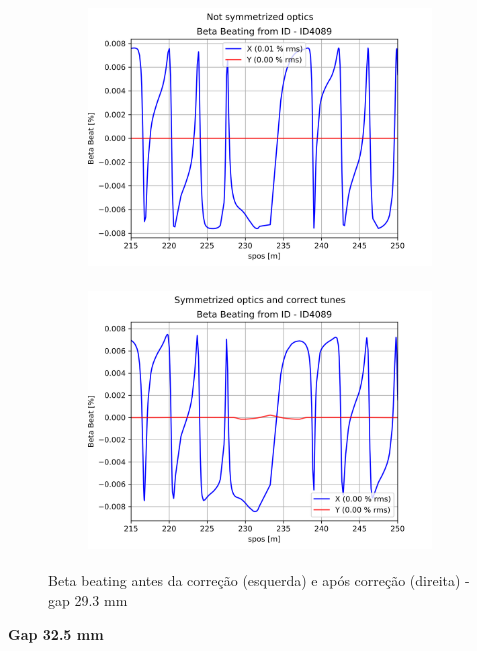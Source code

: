 \documentclass[a4paper,12pt]{article}
\begin{document}
\begin{figure}[H]
\begin{subfigure}{0.5\textwidth}
\includegraphics[width=0.9\linewidth, height=7cm]{figs/phase0 gap29 uncorrected-optics.png} 
\label{fig:subim1029}
\end{subfigure}
\begin{subfigure}{0.5\textwidth}
\includegraphics[width=0.9\linewidth, height=7cm]{figs/phase0 gap29 corrected-optics-tunes.png}
\label{fig:subim2029}
\end{subfigure}
\caption{Beta beating antes da correção (esquerda) e após correção (direita) - gap 29.3 mm}
\label{fig:bb0_29}
\end{figure}

\textbf{Gap 32.5 mm} \\
\end{document}
